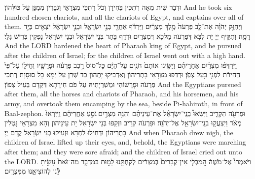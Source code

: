 {{{}}
{וּדְבַר שֵׁית מְאָה רְתִכִּין בְּחִירָן וְכֹל רְתִכֵּי מִצְרָאֵי וְגִבָּרִין מְמֻנַּן עַל כּוּלְּהוֹן׃}
{And he took six hundred chosen chariots, and all the chariots of Egypt, and captains over all of them.}{}
{וַיְחַזֵּ֣ק יְהֹוָ֗ה אֶת־לֵ֤ב פַּרְעֹה֙ מֶ֣לֶךְ מִצְרַ֔יִם וַיִּרְדֹּ֕ף אַחֲרֵ֖י בְּנֵ֣י יִשְׂרָאֵ֑ל וּבְנֵ֣י יִשְׂרָאֵ֔ל יֹצְאִ֖ים בְּיָ֥ד רָמָֽה׃
}
{וְתַקֵּיף יְיָ יָת לִבָּא דְּפַרְעֹה מַלְכָּא דְּמִצְרַיִם וּרְדַף בָּתַר בְּנֵי יִשְׂרָאֵל וּבְנֵי יִשְׂרָאֵל נָפְקִין בְּרֵישׁ גְּלֵי׃}
{And the LORD hardened the heart of Pharaoh king of Egypt, and he pursued after the children of Israel; for the children of Israel went out with a high hand.}{}
{וַיִּרְדְּפ֨וּ מִצְרַ֜יִם אַחֲרֵיהֶ֗ם וַיַּשִּׂ֤יגוּ אוֹתָם֙ חֹנִ֣ים עַל־הַיָּ֔ם כׇּל־סוּס֙ רֶ֣כֶב פַּרְעֹ֔ה וּפָרָשָׁ֖יו וְחֵיל֑וֹ עַל־פִּי֙ הַֽחִירֹ֔ת לִפְנֵ֖י בַּ֥עַל צְפֹֽן׃}
{וּרְדַפוּ מִצְרָאֵי בָּתְרֵיהוֹן וְאַדְבִּיקוּ יָתְהוֹן כַּד שְׁרַן עַל יַמָּא כָּל סוּסָוָת רְתִכֵּי פַרְעֹה וּפָרָשׁוֹהִי וּמַשְׁרְיָתֵיהּ עַל פֹּם חִירָתָא דִּקְדָם בְּעֵיל צְפוֹן׃}
{And the Egyptians pursued after them, all the horses and chariots of Pharaoh, and his horsemen, and his army, and overtook them encamping by the sea, beside Pi-hahiroth, in front of Baal-zephon.}{}
{וּפַרְעֹ֖ה הִקְרִ֑יב וַיִּשְׂאוּ֩ בְנֵֽי־יִשְׂרָאֵ֨ל אֶת־עֵינֵיהֶ֜ם וְהִנֵּ֥ה מִצְרַ֣יִם \legarmeh  נֹסֵ֣עַ אַחֲרֵיהֶ֗ם וַיִּֽירְאוּ֙ מְאֹ֔ד וַיִּצְעֲק֥וּ בְנֵֽי־יִשְׂרָאֵ֖ל אֶל־יְהֹוָֽה׃
}
{וּפַרְעֹה קְרֵיב וּזְקַפוּ בְּנֵי יִשְׂרָאֵל יָת עֵינֵיהוֹן וְהָא מִצְרָאֵי נָטְלִין בָּתְרֵיהוֹן וּדְחִילוּ לַחְדָּא וּזְעִיקוּ בְנֵי יִשְׂרָאֵל קֳדָם יְיָ׃}
{And when Pharaoh drew nigh, the children of Israel lifted up their eyes, and, behold, the Egyptians were marching after them; and they were sore afraid; and the children of Israel cried out unto the LORD.}{}
{וַיֹּאמְרוּ֮ אֶל־מֹשֶׁה֒ הֲֽמִבְּלִ֤י אֵין־קְבָרִים֙ בְּמִצְרַ֔יִם לְקַחְתָּ֖נוּ לָמ֣וּת בַּמִּדְבָּ֑ר מַה־זֹּאת֙ עָשִׂ֣יתָ לָּ֔נוּ לְהוֹצִיאָ֖נוּ מִמִּצְרָֽיִם׃
}}
